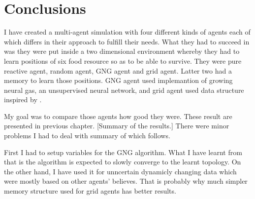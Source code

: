 \chapter{Conclusions}

I have created a multi-agent simulation with four different kinds of agents each of which differs in their approach to fulfill their needs. What they had to succeed in was they were put inside a two dimensional environment whereby they had to learn positions of six food resource so as to be able to survive. They were pure reactive agent, random agent, GNG agent and grid agent. Latter two had a memory to learn those positions. GNG agent used implemantion of growing neural gas, an unsupervised neural network, and grid agent used data structure inspired by \cite{Brom:placeandobjects}.

My goal was to compare those agents how good they were. These result are presented in previous chapter. [Summary of the results.] There were minor problems I had to deal with summary of which follows.

First I had to setup variables for the GNG algorithm. What I have learnt from that is the algorithm is expected to slowly converge to the learnt topology. On the other hand, I have used it for unncertain dynamicly changing data which were mostly based on other agents' believes. That is probably why much simpler memory structure used for grid agents has better results.

 